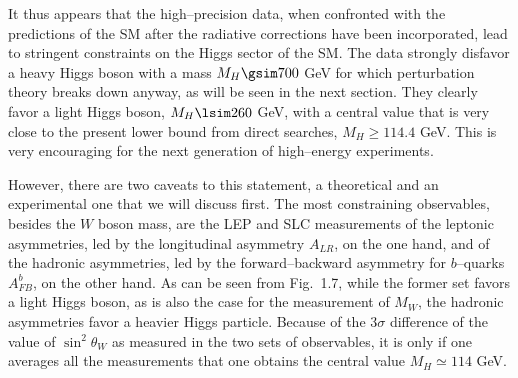 It thus appears that the high--precision data, when confronted with the 
predictions of the SM after the radiative corrections have been
incorporated, lead to stringent constraints on the Higgs sector of the SM.   
 The data strongly disfavor a heavy Higgs boson with a mass $M_H
\gsim 700$ GeV for which perturbation theory breaks down anyway, as will be
seen in the next section. They clearly favor a light Higgs boson, $M_H \lsim
260$ GeV, with a central value that is very close to the present lower bound
from direct searches, $M_H \geq 114.4$ GeV. This is very encouraging for the
next generation of high--energy experiments. \s

However, there are two caveats to this statement, a theoretical and an
experimental one that we will discuss first. The most constraining observables,
besides the $W$ boson mass, are the LEP and SLC measurements of the leptonic
asymmetries, led by the longitudinal asymmetry $A_{LR}$, on the one hand, and of
the hadronic asymmetries, led by the forward--backward asymmetry for
$b$--quarks $A_{FB}^b$, on the other hand.  As can be seen from Fig.~1.7, while
the former set favors a light Higgs boson, as is also the case for the
measurement of $M_W$, the hadronic asymmetries favor a heavier Higgs particle. 
Because of the 3$\sigma$ difference of the value of $\sin^2\theta_W$ as measured
in the two sets of observables, it is only if one averages all the measurements
that one obtains the central value $M_H \simeq 114$ GeV.\s

